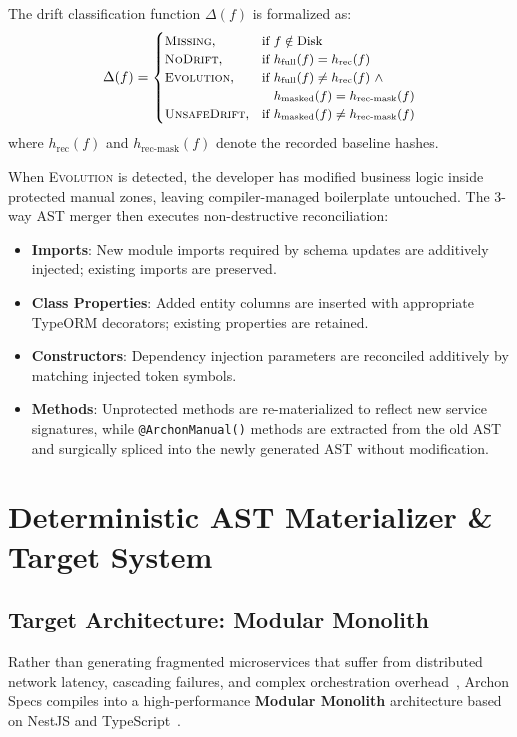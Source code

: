 The drift classification function $\Delta(f)$ is formalized as:
\begin{equation}
\label{eq:drift}
\small
\Delta(f) = 
\begin{cases}
  \textsc{Missing}, & \text{if } f \notin \text{Disk} \\
  \textsc{NoDrift}, & \text{if } h_{\text{full}}(f) = h_{\text{rec}}(f) \\
  \textsc{Evolution}, & \text{if } h_{\text{full}}(f) \neq h_{\text{rec}}(f) \ \land \\
                      & \phantom{\text{if }} h_{\text{masked}}(f) = h_{\text{rec-mask}}(f) \\
  \textsc{UnsafeDrift}, & \text{if } h_{\text{masked}}(f) \neq h_{\text{rec-mask}}(f)
\end{cases}
\end{equation}
where $h_{\text{rec}}(f)$ and $h_{\text{rec-mask}}(f)$ denote the recorded baseline hashes.

When \textsc{Evolution} is detected, the developer has modified business logic inside protected manual zones, leaving compiler-managed boilerplate untouched. The 3-way AST merger then executes non-destructive reconciliation:
\begin{itemize}[leftmargin=*]
  \item \textbf{Imports}: New module imports required by schema updates are additively injected; existing imports are preserved.
  \item \textbf{Class Properties}: Added entity columns are inserted with appropriate TypeORM decorators; existing properties are retained.
  \item \textbf{Constructors}: Dependency injection parameters are reconciled additively by matching injected token symbols.
  \item \textbf{Methods}: Unprotected methods are re-materialized to reflect new service signatures, while \texttt{@ArchonManual()} methods are extracted from the old AST and surgically spliced into the newly generated AST without modification.
\end{itemize}

\section{Deterministic AST Materializer \& Target System}
\label{sec:materializer}

\subsection{Target Architecture: Modular Monolith}
Rather than generating fragmented microservices that suffer from distributed network latency, cascading failures, and complex orchestration overhead~\cite{newman2019monolith,blinowski2022monolithic,fowler2015monolithfirst}, Archon Specs compiles into a high-performance \textbf{Modular Monolith} architecture based on NestJS and TypeScript~\cite{bierman2014understanding}.

